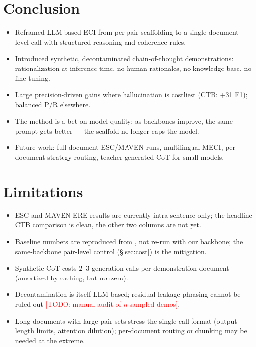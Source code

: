 \documentclass[11pt]{article}
\newcommand{\todo}[1]{\textcolor{red}{[TODO: #1]}}
\begin{document}
\section{Conclusion}
\begin{itemize}
  \item Reframed LLM-based ECI from per-pair scaffolding to a single
        document-level call with structured reasoning and coherence rules.
  \item Introduced synthetic, decontaminated chain-of-thought demonstrations:
        rationalization at inference time, no human rationales, no knowledge
        base, no fine-tuning.
  \item Large precision-driven gains where hallucination is costliest (CTB:
        +31 F1); balanced P/R elsewhere.
  \item The method is a bet on model quality: as backbones improve, the same
        prompt gets better --- the scaffold no longer caps the model.
  \item Future work: full-document ESC/MAVEN runs, multilingual MECI,
        per-document strategy routing, teacher-generated CoT for small models.
\end{itemize}

\section*{Limitations}
\begin{itemize}
  \item ESC and MAVEN-ERE results are currently intra-sentence only; the
        headline CTB comparison is clean, the other two columns are not yet.
  \item Baseline numbers are reproduced from \citet{hao2026sere}, not re-run
        with our backbone; the same-backbone pair-level control
        (\S\ref{sec:cost}) is the mitigation.
  \item Synthetic CoT costs $2$--$3$ generation calls per demonstration
        document (amortized by caching, but nonzero).
  \item Decontamination is itself LLM-based; residual leakage phrasing cannot
        be ruled out \todo{manual audit of $n$ sampled demos}.
  \item Long documents with large pair sets stress the single-call format
        (output-length limits, attention dilution); per-document routing or
        chunking may be needed at the extreme.
\end{itemize}
\end{document}
